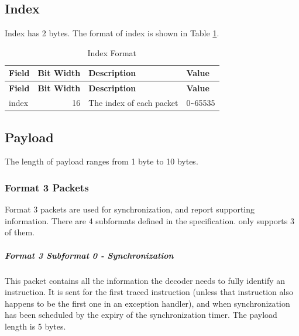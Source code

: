 \documentclass[main\_\_EN.tex]{subfiles}
\begin{document}
\subsection{Index}

Index has 2 bytes. The format of index is shown in Table \ref{tab:index}.

\begin{longtable}[c]{ |l|r|l|l| }
    \caption{Index Format}
    \label{tab:index}
    \\\hline\rowcolor{lightgray}
    \textbf{Field} & \textbf{Bit Width} & \textbf{Description} & \textbf{Value}\\\hline
    \endfirsthead
    \textbf{Field} & \textbf{Bit Width} & \textbf{Description} & \textbf{Value}\\\hline
    \endhead
    \endfoot
    \endlastfoot

    index & 16 & The index of each packet & 0\verb+~+65535 \\\hline
 \end{longtable}

\subsection{Payload}

The length of payload ranges from 1 byte to 10 bytes.

\subsubsection{Format 3 Packets}

Format 3 packets are used for synchronization, and report supporting information. There are 4 subformats defined in the specification. \chipname{} only supports 3 of them.

\subparagraph{Format 3 Subformat 0 - Synchronization}\label{sec:riscvtracenc-format-3-sub-0}

This packet contains all the information the decoder needs to fully identify an instruction. It is sent for the first traced instruction (unless that instruction also happens to be the first one in an exception handler), and when synchronization has been scheduled by the expiry of the synchronization timer. The payload length is 5 bytes.
\end{document}
